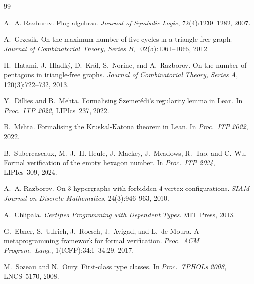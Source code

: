 \documentclass{article}
\begin{document}

\begin{thebibliography}{99}

A.~A. Razborov.
\newblock Flag algebras.
\newblock \textit{Journal of Symbolic Logic}, 72(4):1239--1282, 2007.

A.~Grzesik.
\newblock On the maximum number of five-cycles in a triangle-free graph.
\newblock \textit{Journal of Combinatorial Theory, Series B},
  102(5):1061--1066, 2012.

H.~Hatami, J.~Hladk\'{y}, D.~Kr\'{a}l, S.~Norine, and A.~Razborov.
\newblock On the number of pentagons in triangle-free graphs.
\newblock \textit{Journal of Combinatorial Theory, Series A},
  120(3):722--732, 2013.

Y.~Dillies and B.~Mehta.
\newblock Formalising Szemer\'{e}di's regularity lemma in Lean.
\newblock In \textit{Proc.\ ITP 2022}, LIPIcs~237, 2022.

B.~Mehta.
\newblock Formalising the Kruskal-Katona theorem in Lean.
\newblock In \textit{Proc.\ ITP 2022}, 2022.

B.~Subercaseaux, M.~J.~H. Heule, J.~Mackey, J.~Meadows, R.~Tao, and
  C.~Wu.
\newblock Formal verification of the empty hexagon number.
\newblock In \textit{Proc.\ ITP 2024}, LIPIcs~309, 2024.

A.~A. Razborov.
\newblock On 3-hypergraphs with forbidden 4-vertex configurations.
\newblock \textit{SIAM Journal on Discrete Mathematics}, 24(3):946--963, 2010.

A.~Chlipala.
\newblock \textit{Certified Programming with Dependent Types}.
\newblock MIT Press, 2013.

G.~Ebner, S.~Ullrich, J.~Roesch, J.~Avigad, and L.~de Moura.
\newblock A metaprogramming framework for formal verification.
\newblock \textit{Proc.\ ACM Program.\ Lang.}, 1(ICFP):34:1--34:29, 2017.

M.~Sozeau and N.~Oury.
\newblock First-class type classes.
\newblock In \textit{Proc.\ TPHOLs 2008}, LNCS~5170, 2008.

\end{thebibliography}
\end{document}
